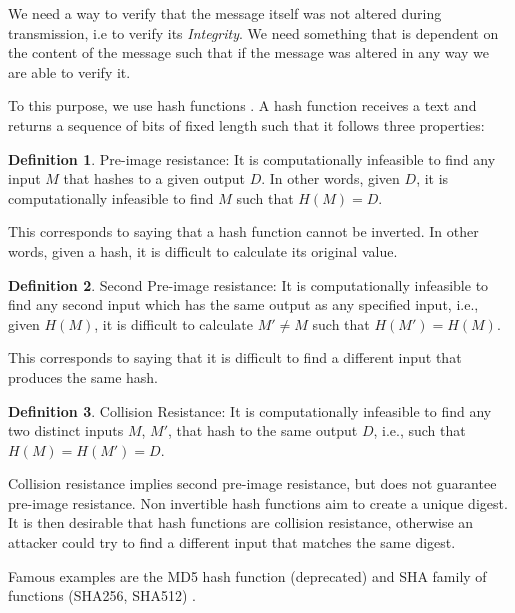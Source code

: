 \documentclass[12pt,a4paper]{article}
\theoremstyle{definition}
\newtheorem{definition}{Definition}[section]
\begin{document}
We need a way to verify that the message itself was not altered during transmission, i.e to verify its \emph{Integrity}. We need something that is dependent on the content of the message such that if the message was altered in any way we are able to verify it.

To this purpose, we use hash functions \cite{rogaway2004}. A hash function receives a text and returns a sequence of bits of fixed length such that it follows three properties:

\theoremstyle{definition}
\begin{definition}{Pre-image resistance:}
It is computationally infeasible to find any input $M$ that hashes to a given output $D$. In other words, given $D$, it is computationally infeasible to find $M$ such that $H(M) = D$.

\end{definition}


This corresponds to saying that a hash function cannot be inverted. In other words, given a hash, it is difficult to calculate its original value.


\theoremstyle{definition}
\begin{definition}{Second Pre-image resistance:}
It is computationally infeasible to find any second input which has the same output as any specified input, i.e., given $H(M)$, it is difficult to calculate $M' \neq M$ such that $H(M') = H(M)$.

\end{definition}

 
This corresponds to saying that it is difficult to find a different input that produces the same hash. 

\theoremstyle{definition}
\begin{definition}{Collision Resistance:}
It is computationally infeasible to find any two distinct inputs $M$, $M'$, that hash to the same output $D$, i.e., such that $H(M) = H(M') = D$.
 

\end{definition}

Collision resistance implies second pre-image resistance, but does not guarantee pre-image resistance. Non invertible hash functions aim to create a unique digest. It is then desirable that hash functions are collision resistance, otherwise an attacker could try to find a different input that matches the same digest.

Famous examples are the MD5 hash function (deprecated) and SHA family of functions (SHA256, SHA512) \cite{conrad2016}. 
\end{document}
